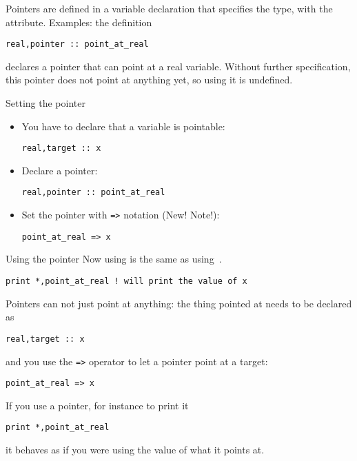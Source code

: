 Pointers are defined in a variable declaration
that specifies the type, with the  attribute.
Examples: the definition
\begin{lstlisting}
real,pointer :: point_at_real
\end{lstlisting}
declares a pointer that can point at a real variable.
Without further specification, this pointer
does not point at anything yet,
so using it is undefined.

\begin{block}{Setting the pointer}
  \label{sl:fpoint-set}
  \begin{itemize}
  \item You have to declare that a variable is pointable:
\begin{lstlisting}
real,target :: x
\end{lstlisting}
\item Declare a pointer:
\begin{lstlisting}
real,pointer :: point_at_real
\end{lstlisting}
\item Set the pointer with \verb+=>+ notation (New! Note!):
\begin{lstlisting}
point_at_real => x
\end{lstlisting}
  \end{itemize}
\end{block}

\begin{block}{Using the pointer}
  \label{sl:fpoint-use}
Now using  is the same as using~.
\begin{lstlisting}
print *,point_at_real ! will print the value of x
\end{lstlisting}
\end{block}

Pointers can not just point at anything: the thing pointed at needs to
be declared as 
\begin{lstlisting}
real,target :: x
\end{lstlisting}
and you use the \verb+=>+ operator to let a pointer point at a target:
\begin{lstlisting}
point_at_real => x
\end{lstlisting}

If you use a pointer, for instance to print it
\begin{lstlisting}
print *,point_at_real
\end{lstlisting}
it behaves as if you were using the value of what it points at.

